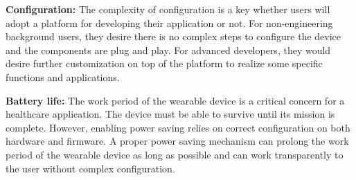 \vspace{10pt}
\textbf{Configuration:}
\newline
The complexity of configuration is a key whether users will adopt a platform for developing their application or not. For non-engineering background users, they desire there is no complex steps to configure the device and the components are plug and play. For advanced developers, they would desire further customization on top of the platform to realize some specific functions and applications. 

\vspace{10pt}
\textbf{Battery life:}
\newline
The work period of the wearable device is a critical concern for a healthcare application. The device must be able to survive until its mission is complete. However, enabling power saving relies on correct configuration on both hardware and firmware. A proper power saving mechanism can prolong the work period of the wearable device as long as possible and can work transparently to the user without complex configuration.


